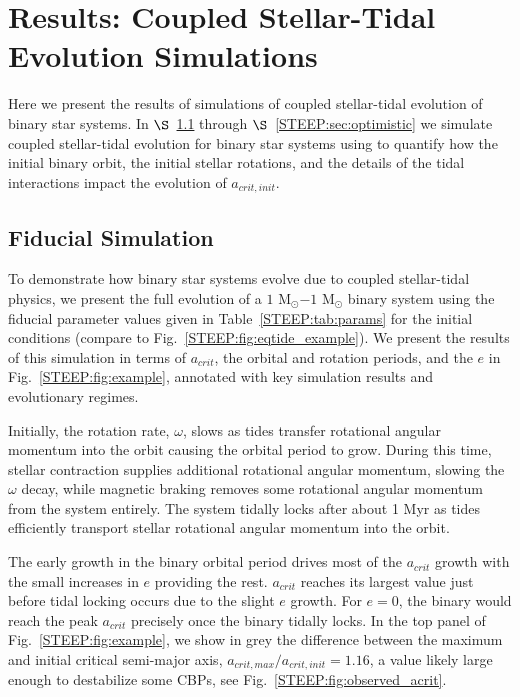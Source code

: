 \section{Results: Coupled Stellar-Tidal Evolution Simulations} \label{STEEP:sec:results}

Here we present the results of simulations of coupled stellar-tidal evolution of binary star systems.  In $\S$~\ref{STEEP:sec:fiducial_simulation} through $\S$~\ref{STEEP:sec:optimistic} we simulate coupled stellar-tidal evolution for binary star systems using \vplanet to quantify how the initial binary orbit, the initial stellar rotations, and the details of the tidal interactions impact the evolution of $a_{crit,init}$.

\subsection{Fiducial Simulation} \label{STEEP:sec:fiducial_simulation}

To demonstrate how binary star systems evolve due to coupled stellar-tidal physics, we present the full evolution of a $1$ M$_{\odot}$$-1$ M$_{\odot}$ binary system using the fiducial parameter values given in Table~\ref{STEEP:tab:params} for the initial conditions (compare to Fig.~\ref{STEEP:fig:eqtide_example}).  We present the results of this simulation in terms of $a_{crit}$, the orbital and rotation periods, and the $e$ in Fig.~\ref{STEEP:fig:example}, annotated with key simulation results and evolutionary regimes.

Initially,  the rotation rate, $\omega$, slows as tides transfer rotational angular momentum into the orbit causing the orbital period to grow.  During this time, stellar contraction supplies additional rotational angular momentum, slowing the $\omega$ decay, while magnetic braking removes some rotational angular momentum from the system entirely.  The system tidally locks after about 1 Myr as tides efficiently transport stellar rotational angular momentum into the orbit.

The early growth in the binary orbital period drives most of the $a_{crit}$ growth with the small increases in $e$ providing the rest.  $a_{crit}$ reaches its largest value just before tidal locking occurs due to the slight $e$ growth.  For $e=0$, the binary would reach the peak $a_{crit}$ precisely once the binary tidally locks.  In the top panel of Fig.~\ref{STEEP:fig:example}, we show in grey the difference between the maximum and initial critical semi-major axis, $a_{crit,max}/a_{crit,init} = 1.16$, a value likely large enough to destabilize some CBPs, see Fig.~\ref{STEEP:fig:observed_acrit}.  

